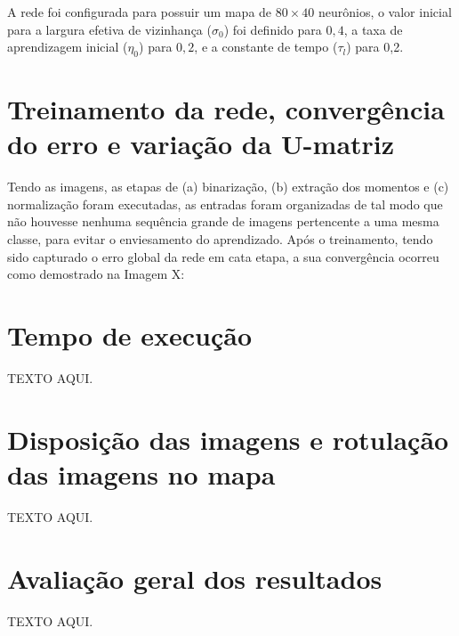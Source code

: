 A rede foi configurada para possuir um mapa de $ 80\times40 $ neurônios, o valor inicial
para a largura efetiva de vizinhança ($ \sigma_0 $) foi definido para $ 0,4 $, a taxa de
aprendizagem inicial ($ \eta_0 $) para $ 0,2 $, e a constante de tempo ($ \tau_l $) para 0,2.

\section{Treinamento da rede, convergência do erro e variação da U-matriz}

Tendo as imagens, as etapas de (a) binarização, (b) extração dos momentos e
(c) normalização foram executadas, as entradas foram organizadas de tal modo que
não houvesse nenhuma sequência grande de imagens pertencente a uma mesma classe,
para evitar o enviesamento do aprendizado. Após o treinamento, tendo sido
capturado o erro global da rede em cata etapa, a sua convergência ocorreu como
demostrado na Imagem X:



\section{Tempo de execução}

TEXTO AQUI.

\section{Disposição das imagens e rotulação das imagens no mapa}

TEXTO AQUI.

\section{Avaliação geral dos resultados}

TEXTO AQUI.

